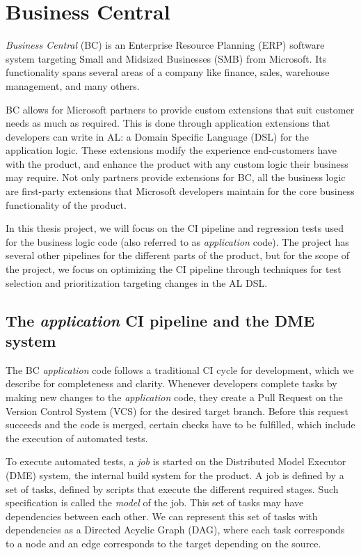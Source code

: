 \section{Business Central}

\emph{Business Central} (BC) is an Enterprise Resource Planning (ERP) software 
system targeting Small and Midsized Businesses (SMB) from Microsoft. Its functionality
spans several areas of a company like finance, sales, warehouse management, and
many others.

BC allows for Microsoft partners to provide custom extensions that suit customer
needs as much as required. This is done through application extensions that developers
can write in AL: a Domain Specific Language (DSL) for the application logic. 
These extensions modify the experience end-customers have with the product, and 
enhance the product with any custom logic their business may require.
Not only partners provide extensions for BC, all the business logic
are first-party extensions that Microsoft developers maintain for the core business 
functionality of the product.

In this thesis project, we will focus on the CI pipeline and regression tests
used for the business logic code (also referred to as \emph{application} code).
The project has several other pipelines for the different parts of the product,
but for the scope of the project, we focus on optimizing the CI pipeline through
techniques for test selection and prioritization targeting changes in the AL DSL.

\subsection{The \emph{application} CI pipeline and the DME system}\label{s:bc-ci-dme}

The BC \emph{application} code follows a traditional CI cycle for development, which we describe 
for completeness and clarity. Whenever developers complete tasks by making new 
changes to the \emph{application} code, they create a Pull Request on the 
Version Control System (VCS) for the desired target branch. Before this request
succeeds and the code is merged, certain checks have to be fulfilled, which 
include the execution of automated tests.

To execute automated tests, a \emph{job} is started on the Distributed Model Executor (DME)
system, the internal build system for the product.  A job is defined by a set of 
tasks, defined by scripts that execute the different required stages. Such specification is
called the \emph{model} of the job. This set of tasks may have dependencies between each other. 
We can represent this set of tasks with dependencies as a Directed Acyclic Graph (DAG), where
each task corresponds to a node and an edge corresponds to the target depending on the source.

